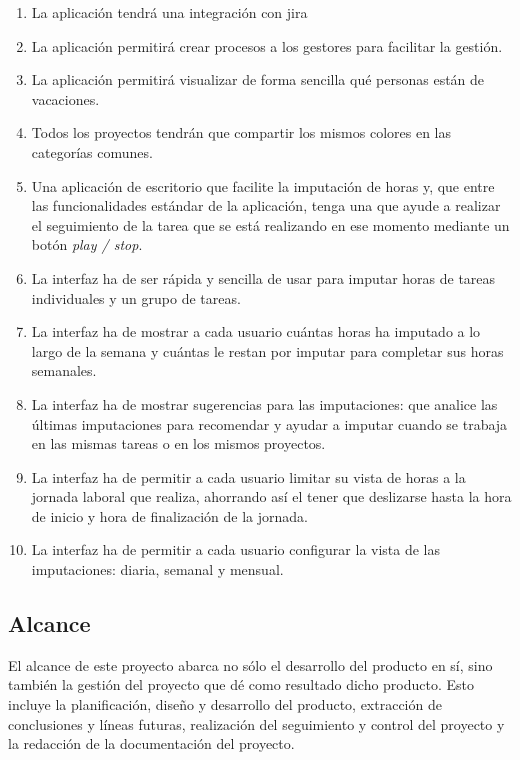 \begin{enumerate}
 \item La aplicación tendrá una integración con \gls{jira}

 \item La aplicación permitirá crear procesos a los gestores para facilitar
 la gestión.

 \item La aplicación permitirá visualizar de forma sencilla qué personas
 están de vacaciones.

 \item Todos los proyectos tendrán que compartir los mismos colores en las
 categorías comunes.

 \item Una aplicación de escritorio que facilite la imputación de horas
 y, que entre las funcionalidades estándar de la aplicación, tenga una que
 ayude a realizar el seguimiento de la tarea que se está realizando en
 ese momento mediante un botón \textit{play / stop}.

 \item La interfaz ha de ser rápida y sencilla de usar para imputar horas de
 tareas individuales y un grupo de tareas.

 \item La interfaz ha de mostrar a cada usuario cuántas horas ha imputado
 a lo largo de la semana y cuántas le restan por imputar para completar sus
 horas semanales.

 \item La interfaz ha de mostrar sugerencias para las imputaciones: que analice
 las últimas imputaciones para recomendar y ayudar a imputar cuando se trabaja
 en las mismas tareas o en los mismos proyectos.

 \item La interfaz ha de permitir a cada usuario limitar su vista de horas a la
 jornada laboral que realiza, ahorrando así el tener que deslizarse hasta la
 hora de inicio y hora de finalización de la jornada.

 \item La interfaz ha de permitir a cada usuario configurar la vista de las
 imputaciones: diaria, semanal y mensual.
\end{enumerate}

\subsection{Alcance}
El alcance de este proyecto abarca no sólo el desarrollo del producto en sí,
sino también la gestión del proyecto que dé como resultado dicho producto. Esto
incluye la planificación, diseño y desarrollo del producto, extracción de
conclusiones y líneas futuras, realización del seguimiento y control del
proyecto y la redacción de la documentación del proyecto.

